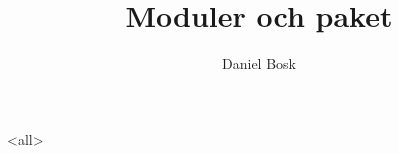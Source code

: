 \documentclass[ignoreframetext]{beamer}
\begin{document}
\title{%
  Moduler och paket
}
\author{Daniel Bosk}

\begin{frame}
  \maketitle
\end{frame}

\mode<all>

\mode*

\begin{frame}[allowframebreaks]
  \printbibliography
\end{frame}
\end{document}
